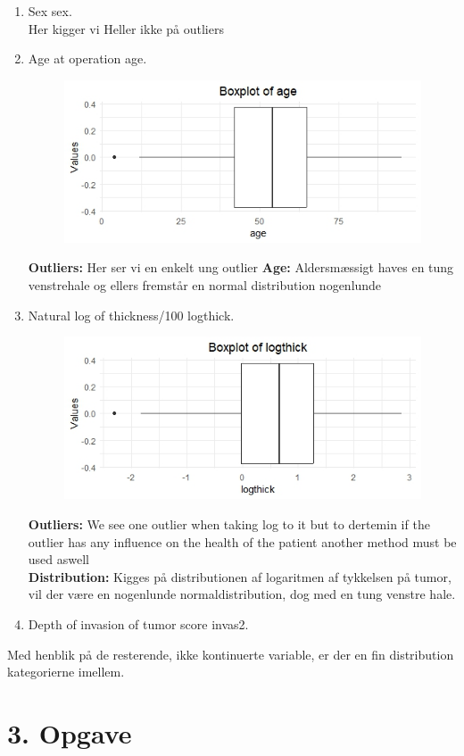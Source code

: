 \begin{enumerate}
\item Sex sex.\\
Her kigger vi Heller ikke på outliers
\item Age at operation age.\\
\begin{figure}
    \centering
    \includegraphics[width=0.5\linewidth]{Project/BIlleder_Duration/Age_Outliers.jpeg}
\end{figure}
\textbf{Outliers: }Her ser vi en enkelt ung outlier 
\textbf{Age: } Aldersmæssigt haves en tung venstrehale og ellers fremstår en normal distribution nogenlunde
\item Natural log of thickness/100 logthick.\\
\begin{figure}
    \centering
    \includegraphics[width=0.5\linewidth]{Project/BIlleder_Duration/logthickness_Outlier.jpeg}
\end{figure}
\textbf{Outliers: }We see one outlier when taking log to it but to dertemin if the outlier has any influence on the health of the patient another method must be used aswell\\
\textbf{Distribution: }Kigges på distributionen af logaritmen af tykkelsen på tumor, vil der være en nogenlunde normaldistribution, dog med en tung venstre hale.
\item Depth of invasion of tumor score invas2.
\end{enumerate}

Med henblik på de resterende, ikke kontinuerte variable, er der en fin distribution kategorierne imellem.



\chapter{3. Opgave}
